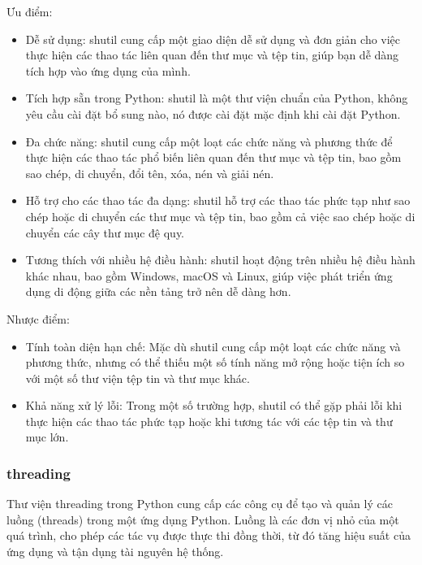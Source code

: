 \documentclass{article} %
\begin{document}
Ưu điểm:
\begin{itemize}
    \item Dễ sử dụng: shutil cung cấp một giao diện dễ sử dụng và đơn giản cho việc thực hiện các thao tác liên quan đến thư mục và tệp tin, giúp bạn dễ dàng tích hợp vào ứng dụng của mình.
    \item Tích hợp sẵn trong Python: shutil là một thư viện chuẩn của Python, không yêu cầu cài đặt bổ sung nào, nó được cài đặt mặc định khi cài đặt Python.
    \item Đa chức năng: shutil cung cấp một loạt các chức năng và phương thức để thực hiện các thao tác phổ biến liên quan đến thư mục và tệp tin, bao gồm sao chép, di chuyển, đổi tên, xóa, nén và giải nén.
    \item Hỗ trợ cho các thao tác đa dạng: shutil hỗ trợ các thao tác phức tạp như sao chép hoặc di chuyển các thư mục và tệp tin, bao gồm cả việc sao chép hoặc di chuyển các cây thư mục đệ quy.
    \item Tương thích với nhiều hệ điều hành: shutil hoạt động trên nhiều hệ điều hành khác nhau, bao gồm Windows, macOS và Linux, giúp việc phát triển ứng dụng di động giữa các nền tảng trở nên dễ dàng hơn.
\end{itemize}
\hspace{0.0em} Nhược điểm:
\begin{itemize}
    \item Tính toàn diện hạn chế: Mặc dù shutil cung cấp một loạt các chức năng và phương thức, nhưng có thể thiếu một số tính năng mở rộng hoặc tiện ích so với một số thư viện tệp tin và thư mục khác.
    \item Khả năng xử lý lỗi: Trong một số trường hợp, shutil có thể gặp phải lỗi khi thực hiện các thao tác phức tạp hoặc khi tương tác với các tệp tin và thư mục lớn.
\end{itemize}
\subsubsection{threading}
Thư viện threading trong Python cung cấp các công cụ để tạo và quản lý các luồng (threads) trong một ứng dụng Python. Luồng là các đơn vị nhỏ của một quá trình, cho phép các tác vụ được thực thi đồng thời, từ đó tăng hiệu suất của ứng dụng và tận dụng tài nguyên hệ thống.
\end{document}
